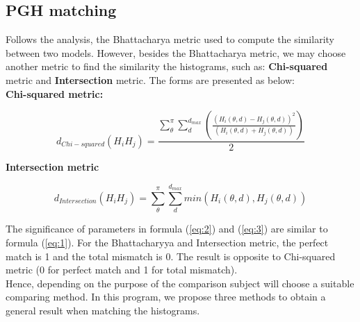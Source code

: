 \subsection{PGH matching}
Follows the analysis, the Bhattacharya metric used to compute the similarity between two models. However, besides the Bhattacharya metric, we may choose another metric to find the similarity the histograms, such as: \textbf{Chi-squared} metric and \textbf{Intersection} metric. The forms are presented as below:\\
\textbf{Chi-squared metric:}
\begin{center}
\begin{equation}\label{eq:2}
d_{Chi-squared} (H_{i}H_{j}) = \frac{\sum\limits_{\theta}^{\pi}\sum\limits_{d}^{d_{max}}(\frac{(H_{i}(\theta,d) - H_{j}(\theta,d))^{2}}{(H_{i}(\theta,d) + H_{j}(\theta,d))})}{2}
\end{equation}
\end{center}
\textbf{Intersection metric}
\begin{center}
\begin{equation}\label{eq:3}
d_{Intersection} (H_{i}H_{j}) = \sum\limits_{\theta}^{\pi}\sum\limits_{d}^{d_{max}}min(H_{i}(\theta,d), H_{j}(\theta,d))
\end{equation}
\end{center}
The significance of parameters in formula (\ref{eq:2}) and (\ref{eq:3}) are similar to formula (\ref{eq:1}). For the Bhattacharyya and Intersection metric, the perfect match is 1 and the total mismatch is 0. The result is opposite to Chi-squared metric (0 for perfect match and 1 for total mismatch).\\[0.2cm]
Hence, depending on the purpose of the comparison subject will choose a suitable comparing method. In this program, we propose three methods to obtain a general result when matching the histograms.
